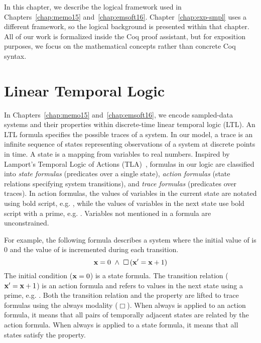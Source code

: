 In this chapter, we describe the logical framework used in
Chapters~\ref{chap:memo15}
and~\ref{chap:emsoft16}. Chapter~\ref{chap:exp-smpl} uses a different
framework, so the logical background is presented within that chapter. All
of our work is formalized inside the Coq proof assistant, but for
exposition purposes, we focus on the mathematical concepts rather than
concrete Coq syntax.

\section{Linear Temporal Logic}
In Chapters~\ref{chap:memo15} and~\ref{chap:emsoft16}, we encode
sampled-data systems and their properties within discrete-time linear
temporal logic (LTL).  An LTL formula specifies the possible traces of a
system.  In our model, a trace is an infinite sequence of states
representing observations of a system at discrete points in time.  A state
is a mapping from variables to real numbers.  Inspired by Lamport's
Temporal Logic of Actions (TLA)~\cite{lamport1994temporal}, formulas in our
logic are classified into \emph{state formulas} (predicates over a single
state), \emph{action formulas} (state relations specifying system
transitions), and \emph{trace formulas} (predicates over traces).  In
action formulas, the values of variables in the current state are notated
using bold script, e.g. , while the values of variables in the
next state use bold script with a prime, e.g. .  Variables
not mentioned in a formula are unconstrained.

For example, the following formula describes a system where the initial
value of  is 0 and the value of  is incremented during
each transition.
\[
\mathbf{x} = 0~\wedge~\Box{} \left(\mathbf{x}^\prime = \mathbf{x} + 1\right)
\]
The initial condition ($\mathbf{x} = 0$) is a state formula.  The
transition relation ($\mathbf{x}^\prime = \mathbf{x} + 1$) is an action
formula and refers to values in the next state using a prime,
e.g. .  Both the transition relation and the property are
lifted to trace formulas using the always modality ($\Box$).  When always
is applied to an action formula, it means that all pairs of temporally
adjacent states are related by the action formula.  When always is applied
to a state formula, it means that all states satisfy the property.

